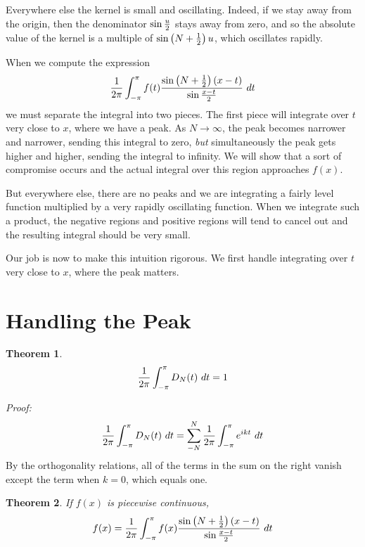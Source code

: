 \documentclass[11pt, oneside]{article}   	%
\newtheorem{theorem}{Theorem}
\begin{document}
Everywhere else the kernel is small and oscillating. Indeed, if we stay away from the origin, then the denominator $\sin {u \over 2}$ stays away from zero, and so the absolute value of the kernel is a multiple of $\sin \left( N + {1 \over 2}\right)u$, which oscillates rapidly.

When we compute the expression
\[ {1 \over {2 \pi}} \int_{- \pi}^\pi f(t) {{\sin \left(N + {1 \over 2}\right)(x - t)} \over {\sin {{x - t} \over 2}}} \ dt \]
we must separate the integral into two pieces. The first piece will integrate over $t$ very close to $x$, where we have a peak. As $N \rightarrow \infty$, the peak becomes narrower and narrower, sending this integral to zero, {\em but} simultaneously the peak gets higher and higher, sending the integral to infinity. We will show that a sort of compromise occurs and the actual integral over this region approaches $f(x)$.

But everywhere else, there are no peaks and we are integrating a fairly level function multiplied by a very rapidly oscillating function. When we integrate such a product, the negative regions and positive regions will tend to cancel out and the resulting integral should be very small.

Our job is now to make this intuition rigorous. We first handle integrating over $t$ very close to $x$, where the peak matters.

\section{Handling the Peak}


\begin{theorem}
\[{1 \over {2 \pi}} \int_{- \pi}^\pi D_N(t)\ dt = 1\]
\end{theorem}

{\em Proof:}
	\[{1 \over {2 \pi}} \int_{- \pi}^\pi D_N(t)\ dt = \sum_{-N}^N {1 \over {2 \pi}} \int_{- \pi}^\pi e^{ikt} \ dt\]
	By the orthogonality relations, all of the terms in the sum on the right vanish except the term when $k = 0$, which equals one.

\begin{theorem} If $f(x)$ is piecewise continuous,
\[f(x) =  {1 \over {2 \pi}} \int_{- \pi}^\pi f(x)  {{\sin \left(N + {1 \over 2}\right)(x - t)} \over {\sin {{x - t} \over 2}}} \ dt\]
\end{theorem}
\end{document}
